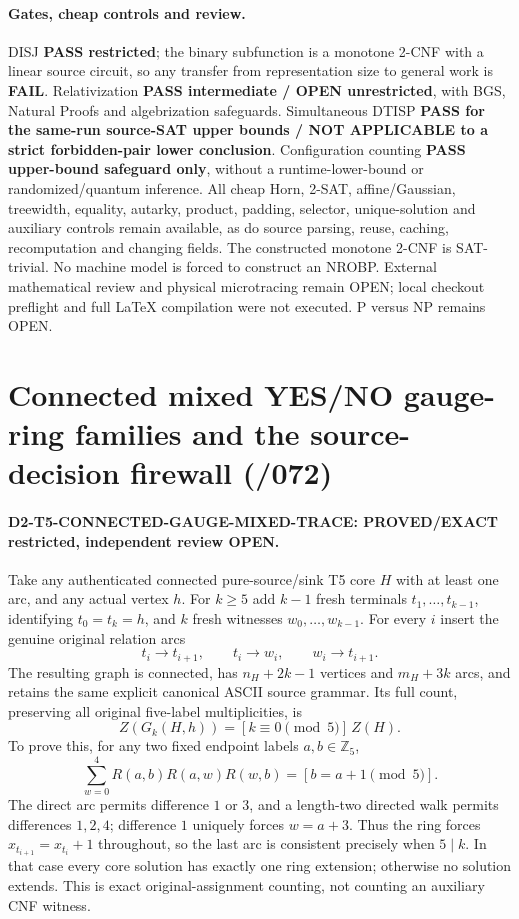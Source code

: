 \documentclass[11pt]{article}
\begin{document}
\paragraph{Gates, cheap controls and review.}
DISJ \textbf{PASS restricted}; the binary
subfunction is a monotone 2-CNF with a linear
source circuit, so any transfer from representation
size to general work is \textbf{FAIL}.
Relativization \textbf{PASS intermediate /
OPEN unrestricted}, with BGS, Natural Proofs
and algebrization safeguards.
Simultaneous DTISP \textbf{PASS for the same-run
source-SAT upper bounds / NOT APPLICABLE to a
strict forbidden-pair lower conclusion}.
Configuration counting \textbf{PASS upper-bound
safeguard only}, without a runtime-lower-bound or
randomized/quantum inference.
All cheap Horn, 2-SAT, affine/Gaussian,
treewidth, equality, autarky, product,
padding, selector, unique-solution and auxiliary
controls remain available, as do source parsing,
reuse, caching, recomputation and changing fields.
The constructed monotone 2-CNF is SAT-trivial.
No machine model is forced to construct an NROBP.
External mathematical review and physical
microtracing remain OPEN; local checkout preflight
and full LaTeX compilation were not executed.
P versus NP remains OPEN.

\section{Connected mixed YES/NO gauge-ring families and the source-decision firewall (/072)}
\paragraph{D2-T5-CONNECTED-GAUGE-MIXED-TRACE: PROVED/EXACT restricted, independent review OPEN.}
Take any authenticated connected pure-source/sink T5 core $H$ with at least one arc, and any actual vertex $h$. For $k\ge5$ add $k-1$ fresh terminals $t_1,\dots,t_{k-1}$, identifying $t_0=t_k=h$, and $k$ fresh witnesses $w_0,\dots,w_{k-1}$. For every $i$ insert the genuine original relation arcs
\[
 t_i\to t_{i+1},\qquad t_i\to w_i,\qquad w_i\to t_{i+1}.
\]
The resulting graph is connected, has $n_H+2k-1$ vertices and $m_H+3k$ arcs, and retains the same explicit canonical ASCII source grammar. Its full count, preserving all original five-label multiplicities, is
\[
 \boxed{Z(G_k(H,h))=[k\equiv0\pmod5]\,Z(H).}
\]
To prove this, for any two fixed endpoint labels $a,b\in\mathbb Z_5$,
\[
 \sum_{w=0}^4R(a,b)R(a,w)R(w,b)
 =[b=a+1\pmod5].
\]
The direct arc permits difference $1$ or $3$, and a length-two directed walk permits differences $1,2,4$; difference $1$ uniquely forces $w=a+3$. Thus the ring forces $x_{t_{i+1}}=x_{t_i}+1$ throughout, so the last arc is consistent precisely when $5\mid k$. In that case every core solution has exactly one ring extension; otherwise no solution extends. This is exact original-assignment counting, not counting an auxiliary CNF witness.
\end{document}
